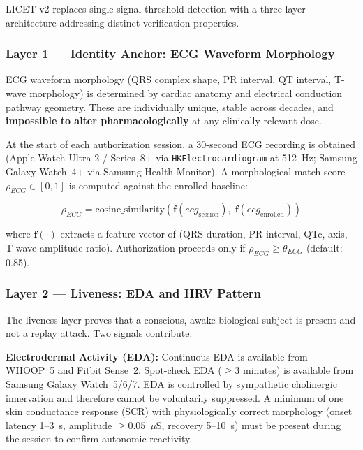 \documentclass[12pt,a4paper]{article}
\begin{document}
LICET v2 replaces single-signal threshold detection with a three-layer
architecture addressing distinct verification properties.

\subsubsection{Layer 1 — Identity Anchor: ECG Waveform Morphology}

ECG waveform morphology (QRS complex shape, PR interval, QT interval, T-wave
morphology) is determined by cardiac anatomy and electrical conduction pathway
geometry. These are individually unique, stable across decades, and
\textbf{impossible to alter pharmacologically} at any clinically relevant dose.

At the start of each authorization session, a 30-second ECG recording is
obtained (Apple Watch Ultra 2 / Series~8+ via \texttt{HKElectrocardiogram} at
512~Hz; Samsung Galaxy Watch~4+ via Samsung Health Monitor). A morphological
match score $\rho_{ECG} \in [0, 1]$ is computed against the enrolled baseline:

\begin{equation}
\rho_{ECG} = \text{cosine\_similarity}\!\left(
  \mathbf{f}(ecg_{\text{session}}),\;
  \mathbf{f}(ecg_{\text{enrolled}})
\right)
\end{equation}

where $\mathbf{f}(\cdot)$ extracts a feature vector of (QRS duration, PR
interval, QTc, axis, T-wave amplitude ratio). Authorization proceeds only if
$\rho_{ECG} \geq \theta_{ECG}$ (default: 0.85).

\subsubsection{Layer 2 — Liveness: EDA and HRV Pattern}

The liveness layer proves that a conscious, awake biological subject is present
and not a replay attack. Two signals contribute:

\textbf{Electrodermal Activity (EDA):} Continuous EDA is available from WHOOP~5
and Fitbit Sense~2. Spot-check EDA ($\geq$3 minutes) is available from Samsung
Galaxy Watch~5/6/7. EDA is controlled by sympathetic cholinergic innervation
and therefore cannot be voluntarily suppressed. A minimum of one skin
conductance response (SCR) with physiologically correct morphology (onset
latency 1--3~s, amplitude $\geq 0.05$~$\mu$S, recovery 5--10~s) must be
present during the session to confirm autonomic reactivity.
\end{document}
